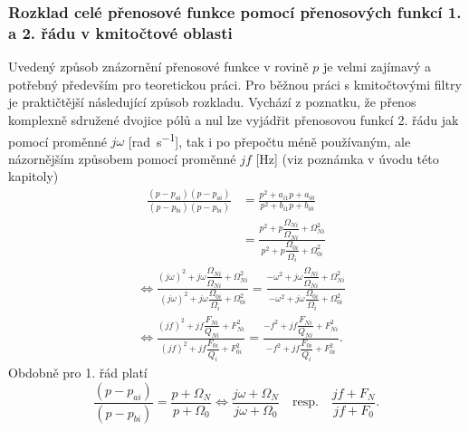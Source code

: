         \subsubsection{Rozklad celé přenosové funkce pomocí přenosových funkcí 1. a 2. řádu v
                       kmitočtové oblasti}
          
          Uvedený způsob znázornění přenosové funkce v rovině \(p\) je velmi zajímavý a potřebný
          především pro teoretickou práci. Pro běžnou práci s kmitočtovými filtry je praktičtější
          následující způsob rozkladu. Vychází z poznatku, že přenos komplexně sdružené dvojice pólů
          a nul lze vyjádřit přenosovou funkcí 2. řádu jak pomocí proměnné \(j\omega\)
          [\unit{\radian\per\second}], tak i po přepočtu méně používaným, ale názornějším způsobem pomocí
          proměnné \(jf\) [\unit{\Hz}] (viz poznámka v úvodu této kapitoly) 
          \begin{align}\label{aes:eq033}
            \frac{(p-p_{ai})(p-p_{ai})}{(p-p_{bi})(p-p_{bi})}
              &= \frac{p^2 + a_{i1}p + a_{i0}}{p^2 + b_{i1}p + b_{i0}}          \nonumber \\ 
              &= \frac{p^2 + p\dfrac{\Omega_{Ni}}{\Omega_{Ni}} +\Omega^2_{Ni}}
                      {p^2 + p\dfrac{\Omega_{0i}}{\Omega_{i}} +\Omega^2_{0i}}        
          \end{align}
          \begin{align}\label{aes:eq040}   
            &\Leftrightarrow
             \frac{(j\omega)^2 + j\omega\dfrac{\Omega_{Ni}}{\Omega_{Ni}} +\Omega^2_{Ni}}
                  {(j\omega)^2 + j\omega\dfrac{\Omega_{0i}}{\Omega_{i}} +\Omega^2_{0i}}
            =\frac{-\omega^2   + j\omega\dfrac{\Omega_{Ni}}{\Omega_{Ni}} +\Omega^2_{Ni}}
                  {-\omega^2   + j\omega\dfrac{\Omega_{0i}}{\Omega_{i}} +\Omega^2_{0i}} \nonumber \\   
            &\Leftrightarrow
              \frac{(jf)^2 + jf\dfrac{F_{Ni}}{Q_{Ni}} + F^2_{Ni}}
                   {(jf)^2 + jf\dfrac{F_{0i}}{Q_{i}}  + F^2_{0i}}
            = \frac{-f^2   + jf\dfrac{F_{Ni}}{Q_{Ni}} + F^2_{Ni}}
                   {-f^2   + jf\dfrac{F_{0i}}{Q_{i}}  + F^2_{0i}}. 
          \end{align}
          Obdobně pro 1. řád platí
          \begin{equation}\label{aes:eq034}
            \frac{(p-p_{ai})}{(p-p_{bi})} = \frac{p + \Omega_N}{p + \Omega_0} \Leftrightarrow
            \frac{j\omega + \Omega_N}{j\omega + \Omega_0}\quad\text{resp.}\quad
            \frac{jf + F_N}{jf + F_0}.
          \end{equation}
                    
